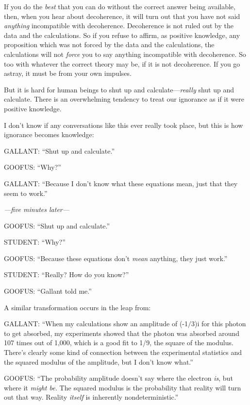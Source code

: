 {
 If you do the \textit{best} that you can do without the correct
answer being available, then, when you hear about decoherence, it will
turn out that you have not said \textit{anything} incompatible with
decoherence. Decoherence is not ruled out by the data and the
calculations. So if you refuse to affirm, as positive knowledge, any
proposition which was not forced by the data and the calculations, the
calculations will not \textit{force} you to say anything incompatible
with decoherence. So too with whatever the correct theory may be, if it
is not decoherence. If you go astray, it must be from your own
impulses.}

{
 But it is hard for human beings to shut up and
calculate---\textit{really} shut up and calculate. There is an
overwhelming tendency to treat our ignorance as if it were positive
knowledge.}

{
 I don't know if any conversations like this ever
really took place, but this is how ignorance becomes knowledge:}

{
 GALLANT: ``Shut up and
calculate.''}

{
 GOOFUS: ``Why?''}

{
 GALLANT: ``Because I don't know
what these equations mean, just that they seem to
work.''}

{
 \textit{{}---five minutes later---}}

{
 GOOFUS: ``Shut up and
calculate.''}

{
 STUDENT: ``Why?''}

{
 GOOFUS: ``Because these equations
don't \textit{mean} anything, they just
work.''}

{
 STUDENT: ``Really? How do you
know?''}

{
 GOOFUS: ``Gallant told me.''}

{
 A similar transformation occurs in the leap from:}

{
 GALLANT: ``When my calculations show an amplitude
of (-1$/$3)i for this photon to get absorbed, my experiments showed
that the photon was absorbed around 107 times out of 1,000, which is a
good fit to 1/9, the square of the modulus. There's
clearly some kind of connection between the experimental statistics and
the squared modulus of the amplitude, but I don't know
what.''}

{
 GOOFUS: ``The probability amplitude
doesn't say where the electron \textit{is}, but where
it \textit{might be.} The squared modulus is the probability that
reality will turn out that way. Reality \textit{itself} is inherently
nondeterministic.''}

